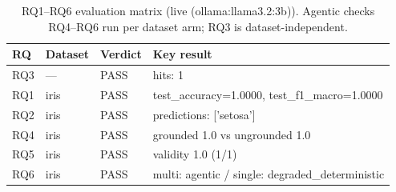 \begin{table}[H]
\centering\small
\caption{RQ1--RQ6 evaluation matrix (live (ollama:llama3.2:3b)). Agentic checks RQ4--RQ6 run per dataset arm; RQ3 is dataset-independent.}
\label{tab:rq-matrix-live-ollama-llama32-iris-20260904}
\begin{tabular}{llll}
\toprule
RQ & Dataset & Verdict & Key result \\
\midrule
RQ3 & — & PASS & hits: 1 \\
RQ1 & iris & PASS & test\_accuracy=1.0000, test\_f1\_macro=1.0000 \\
RQ2 & iris & PASS & predictions: ['setosa'] \\
RQ4 & iris & PASS & grounded 1.0 vs ungrounded 1.0 \\
RQ5 & iris & PASS & validity 1.0 (1/1) \\
RQ6 & iris & PASS & multi: agentic / single: degraded\_deterministic \\
\bottomrule
\end{tabular}
\end{table}
